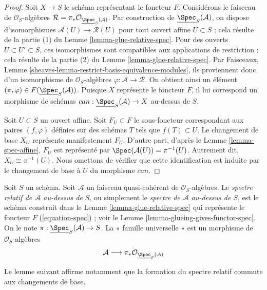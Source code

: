 \begin{proof}
Soit $X \to S$ le schéma représentant le foncteur $F$.
Considérons le faisceau de $\mathcal{O}_S$-algèbres
$\mathcal{R} = \pi_*\mathcal{O}_{\underline{\Spec}_S(\mathcal{A})}$.
Par construction de $\underline{\Spec}_S(\mathcal{A})$,
on dispose d'isomorphismes $\mathcal{A}(U) \to \mathcal{R}(U)$
pour tout ouvert affine $U \subset S$ ; cela résulte de la partie (1) du
Lemme \ref{lemma-glue-relative-spec}.
Pour des ouverts $U \subset U' \subset S$, ces isomorphismes sont
compatibles aux applications de restriction ; cela résulte de la partie (2) du
Lemme \ref{lemma-glue-relative-spec}.
Par Faisceaux, Lemme \ref{sheaves-lemma-restrict-basis-equivalence-modules},
ils proviennent donc d'un isomorphisme de $\mathcal{O}_S$-algèbres
$\varphi : \mathcal{A} \to \mathcal{R}$. On obtient ainsi un élément
$(\pi, \varphi) \in F(\underline{\Spec}_S(\mathcal{A}))$.
Puisque $X$ représente le foncteur $F$, il lui correspond un
morphisme de schémas $can : \underline{\Spec}_S(\mathcal{A}) \to X$
au-dessus de $S$.

\medskip\noindent
Soit $U \subset S$ un ouvert affine. Soit $F_U \subset F$ le
sous-foncteur correspondant aux paires $(f, \varphi)$ définies sur des
schémas $T$ tels que $f(T) \subset U$. Le changement de base
$X_U$ représente manifestement $F_U$. D'autre part, d'après le
Lemme \ref{lemma-spec-affine}, $F_U$ est représenté par
$\Spec(\mathcal{A}(U)) = \pi^{-1}(U)$. Autrement dit, $X_U \cong \pi^{-1}(U)$.
Nous omettons de vérifier que cette identification est induite par le
changement de base à $U$ du morphisme $can$.
\end{proof}

\begin{definition}
\label{definition-relative-spec}
Soit $S$ un schéma. Soit $\mathcal{A}$ un faisceau quasi-cohérent de
$\mathcal{O}_S$-algèbres. Le {\it spectre relatif de $\mathcal{A}$ au-dessus de
$S$}, ou simplement le {\it spectre de $\mathcal{A}$ au-dessus de $S$}, est le schéma
construit dans le Lemme \ref{lemma-glue-relative-spec} qui représente le
foncteur $F$ (\ref{equation-spec}) ; voir le
Lemme \ref{lemma-glueing-gives-functor-spec}.
On le note $\pi : \underline{\Spec}_S(\mathcal{A}) \to S$.
La « famille universelle » est un morphisme de $\mathcal{O}_S$-algèbres
$$
\mathcal{A}
\longrightarrow
\pi_*\mathcal{O}_{\underline{\Spec}_S(\mathcal{A})}
$$
\end{definition}

\noindent
Le lemme suivant affirme notamment que la formation du spectre relatif
commute aux changements de base.

